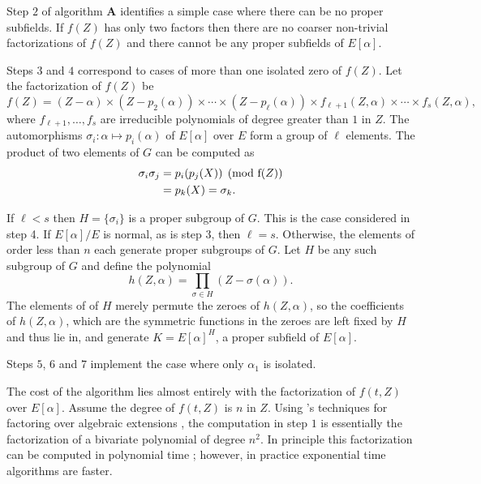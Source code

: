 Step $2$ of algorithm {\bf A} identifies a simple case where there can
be no proper subfields.  If $f(Z)$ has only two factors then there are
no coarser non-trivial factorizations of $f(Z)$ and there cannot be
any proper subfields of $E[\alpha]$.

Steps $3$ and $4$ correspond to cases of more than one isolated zero
of $f(Z)$.  Let the factorization of $f(Z)$ be
\[
f(Z) = (Z - \alpha) \times (Z - p_2(\alpha)) \times \cdots
  \times (Z - p_{\ell}(\alpha)) \times f_{\ell+1}(Z, \alpha) \times
\cdots \times f_{s}(Z, \alpha),
\]
where $f_{\ell + 1}, \ldots, f_s$ are irreducible polynomials of degree greater
than $1$ in $Z$.
The automorphisms $\sigma_i: \alpha \mapsto p_i(\alpha)$ of
$E[\alpha]$ over $E$ form a group of $\ell$ elements.  The product of two
elements of $G$ can be computed as
\[
\begin{aligned}
\sigma_i \sigma_j & = p_i(p_j(X)) \pmod{\hbox{f}(Z)} \\
& = p_k(X) = \sigma_k.
\end{aligned}
\]



If $\ell < s$ then $H = \{\sigma_i\}$ is a proper subgroup of $G$.
This is the case considered in step 4.
If $E[\alpha]/E$ is normal, as is step 3, then $\ell = s$.
Otherwise, the elements of order less than $n$ each generate proper
subgroups of $G$.  Let $H$ be any such subgroup of $G$ and define the
polynomial
\[
h(Z, \alpha) = \prod_{\sigma \in H} \left(Z - \sigma(\alpha)\right).
\]
The elements of of $H$ merely permute the zeroes of $h(Z,
\alpha)$, so the coefficients of $h(Z, \alpha)$, which are
the symmetric functions in the zeroes are left fixed by $H$ and thus
lie in, and generate $K = E[\alpha]^H$, a proper subfield of
$E[\alpha]$.


Steps $5$, $6$ and $7$ implement the case where only $\alpha_1$ is
isolated. 

\medskip
The cost of the algorithm lies almost entirely with the factorization
of $f(t, Z)$ over $E[\alpha]$.  Assume the degree of $f(t, Z)$ is $n$
in $Z$.  Using {\Kronecker}'s techniques for factoring over algebraic
extensions \cite{Trager76a}, the computation in step $1$ is
essentially the factorization of a bivariate polynomial of degree
$n^2$.  In principle this factorization can be computed in polynomial
time \cite{Landau85a,LenstraAK83b,LenstraAK87}; however, in practice
exponential time algorithms are faster.



